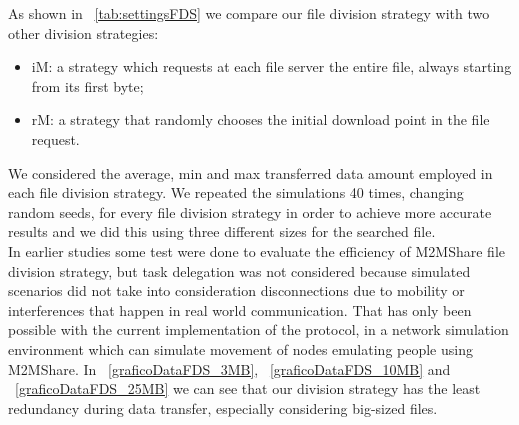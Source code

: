 As shown in \tablename~\ref{tab:settingsFDS} we compare our file division strategy with two other division strategies:
\begin{itemize}
\item iM: a strategy which requests at each file server the
entire file, always starting from its first byte;
\item rM: a strategy that randomly chooses the initial
download point in the file request.
\end{itemize}

We considered the average, min and max transferred data amount employed in each file division strategy. We repeated the simulations 40 times, changing random seeds, for every file division strategy in order to achieve more accurate results and we did this using three different sizes for the searched file. 
\\
In earlier studies some test were done to evaluate the efficiency of M2MShare file division strategy, but task delegation was not considered because simulated scenarios did not take into consideration disconnections due to mobility or interferences that happen in real world
communication. That has only been possible with the current implementation of the protocol, in a network simulation environment which can simulate movement of nodes emulating people using M2MShare.
In \figurename~\ref{graficoDataFDS_3MB}, \figurename~\ref{graficoDataFDS_10MB} and \figurename~\ref{graficoDataFDS_25MB} we can see that our division strategy has the least redundancy during data transfer, especially considering big-sized files.

